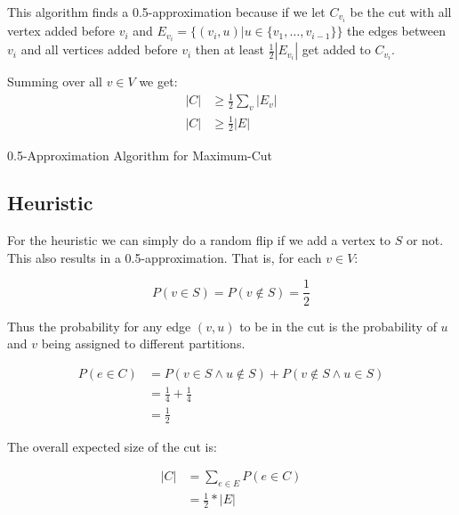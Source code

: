 \documentclass[twocolumn]{article}
\begin{document}
This algorithm finds a 0.5-approximation because if we let $C_{v_i}$ be the cut with all vertex added
before $v_i$ and $E_{v_i} = \{(v_i, u) | u \in \{v_1, \dots, v_{i -1}\}\}$ the edges between $v_i$
and all vertices added before $v_i$ then at least $\frac{1}{2}|E_{v_i}|$ get added to $C_{v_i}$.

Summing over all $v \in V$ we get:
\begin{align*}
  |C| & \geq \frac{1}{2} \sum_{v} |E_v| \\
  |C| & \geq \frac{1}{2} |E|
\end{align*}




\begin{algorithm}
  \caption{0.5-Approximation Algorithm for Maximum-Cut}
  \label{alg:approx}
\end{algorithm}

 
\subsection{Heuristic}

For the heuristic we can simply do a random flip if we add a vertex to $S$ or not.
This also results in a 0.5-approximation. That is, for each $v \in V$:

\[
  P(v \in S) = P(v \notin S) = \frac{1}{2}
\]

Thus the probability for any edge $(v, u)$ to be in the cut is the probability of $u$ and $v$
being assigned to different partitions.

\begin{align*}
  P(e \in C) & = P(v \in S \wedge u \notin S) + P(v \notin S \wedge u \in S) \\
  & = \frac{1}{4} + \frac{1}{4} \\
  & = \frac{1}{2}
\end{align*}

The overall expected size of the cut is:

\begin{align*}
  |C| & = \sum_{e \in E} P(e \in C) \\
  & = \frac{1}{2} * |E|
\end{align*}
\end{document}

